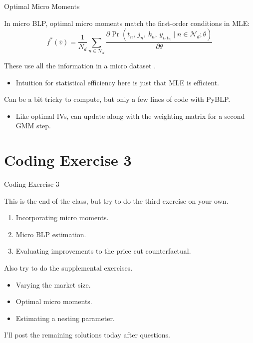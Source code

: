 \documentclass[aspectratio=169,t,11pt,table]{beamer}
\begin{document}
\begin{frame}{Optimal Micro Moments}
    \begin{wideitemize}
        \item In micro BLP, \alert{optimal micro moments} match the first-order conditions in MLE:
        \begin{equation*}
            f^*(\overline{v}) = \frac{1}{N_d} \sum_{n \in \mathcal{N}_d} \frac{\partial\Pr(t_n, \, j_n, \, k_n, \, y_{i_nt_n} \mid n \in \mathcal{N}_d; \theta)}{\partial\theta}
        \end{equation*}
        \vspace{-\baselineskip}
        \pause
        \item These use all the information in a micro dataset \citep{conlon2025incorporating}.
        \begin{itemize}
            \item Intuition for statistical efficiency here is just that MLE is efficient.
        \end{itemize}
        \pause
        \item Can be a bit tricky to compute, but only a few lines of code with PyBLP.
        \begin{itemize}
            \item Like optimal IVs, can update along with the weighting matrix for a second GMM step.
        \end{itemize}
    \end{wideitemize}
\end{frame}

\section{Coding Exercise 3}

\begin{frame}{Coding Exercise 3}
    \begin{wideitemize}
        \item This is the end of the class, but try to do the third exercise on your own.
        \begin{enumerate}
            \item Incorporating micro moments.
            \item Micro BLP estimation.
            \item Evaluating improvements to the price cut counterfactual.
        \end{enumerate}
        \pause
        \item Also try to do the supplemental exercises.
        \begin{itemize}
            \item Varying the market size.
            \item Optimal micro moments.
            \item Estimating a nesting parameter.
        \end{itemize}
        \pause
        \item I'll post the remaining solutions today after questions.
    \end{wideitemize}
\end{frame}
\end{document}
